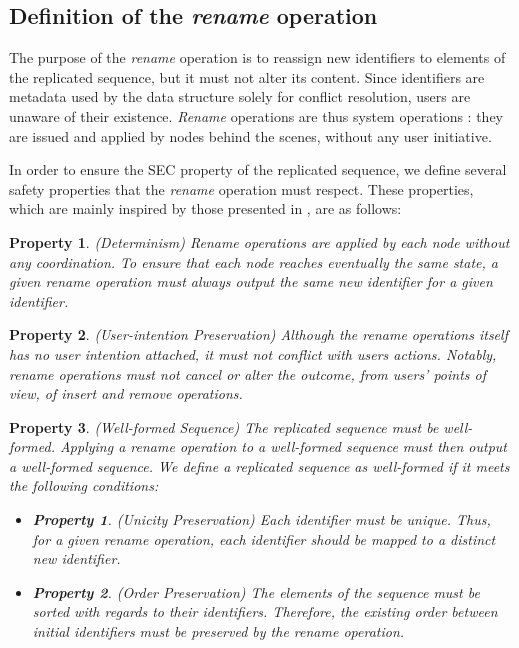\documentclass[10pt,journal,compsoc]{IEEEtran}
\newtheorem{property}{Property}
\newtheorem{subproperty}{Property}[property]
\begin{document}
\subsection{Definition of the \emph{rename} operation}

The purpose of the \emph{rename} operation is to reassign new identifiers to elements of the replicated sequence, but it must not alter its content.
Since identifiers are metadata used by the data structure solely for conflict resolution, users are unaware of their existence.
\emph{Rename} operations are thus system operations : they are issued and applied by nodes behind the scenes, without any user initiative.

In order to ensure the \ac{SEC} property of the replicated sequence, we define several safety properties that the \emph{rename} operation must respect.
These properties, which are mainly inspired by those presented in \cite{zawirski:hal-01248197}, are as follows:

\begin{property}(Determinism)
    \emph{Rename} operations are applied by each node without any coordination.
    To ensure that each node reaches eventually the same state, a given \emph{rename} operation must always output the same new identifier for a given identifier.
\end{property}

\begin{property}(User-intention Preservation)
    Although the \emph{rename} operations itself has no user intention attached, it must not conflict with users actions.
    Notably, \emph{rename} operations must not cancel or alter the outcome, from users' points of view, of \emph{insert} and \emph{remove} operations.
\end{property}

\begin{property}(Well-formed Sequence)
    The replicated sequence must be well-formed.
    Applying a \emph{rename} operation to a well-formed sequence must then output a well-formed sequence.
    We define a replicated sequence as well-formed if it meets the following conditions:
    \begin{itemize}[noitemsep]
        \item[~]
        \begin{subproperty}(Unicity Preservation)
            Each identifier must be unique.
            Thus, for a given \emph{rename} operation, each identifier should be mapped to a distinct new identifier.
        \end{subproperty}
        \item[~]
        \begin{subproperty}(Order Preservation)
            The elements of the sequence must be sorted with regards to their identifiers.
            Therefore, the existing order between initial identifiers must be preserved by the \emph{rename} operation.
        \end{subproperty}
    \end{itemize}
\end{property}
\end{document}

